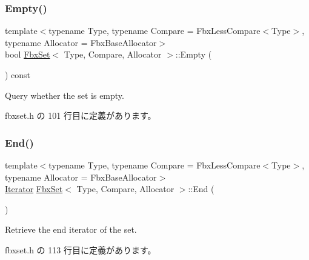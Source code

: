 \subsubsection{\texorpdfstring{Empty()}{Empty()}}
{\footnotesize\ttfamily template$<$typename Type, typename Compare = Fbx\+Less\+Compare$<$\+Type$>$, typename Allocator = Fbx\+Base\+Allocator$>$ \\
bool \hyperlink{class_fbx_set}{Fbx\+Set}$<$ Type, Compare, Allocator $>$\+::Empty (\begin{DoxyParamCaption}{ }\end{DoxyParamCaption}) const\hspace{0.3cm}{\ttfamily [inline]}}



Query whether the set is empty. 



 fbxset.\+h の 101 行目に定義があります。

\mbox{\label{class_fbx_set_aff72352a00b11a896a960f4b562971de}} 
\subsubsection{\texorpdfstring{End()}{End()}\hspace{0.1cm}{\footnotesize\ttfamily [1/2]}}
{\footnotesize\ttfamily template$<$typename Type, typename Compare = Fbx\+Less\+Compare$<$\+Type$>$, typename Allocator = Fbx\+Base\+Allocator$>$ \\
\hyperlink{class_fbx_set_ad1b543e0f63f04f4d2dc8e9e3da9bcaa}{Iterator} \hyperlink{class_fbx_set}{Fbx\+Set}$<$ Type, Compare, Allocator $>$\+::End (\begin{DoxyParamCaption}{ }\end{DoxyParamCaption})\hspace{0.3cm}{\ttfamily [inline]}}



Retrieve the end iterator of the set. 



 fbxset.\+h の 113 行目に定義があります。

\mbox{\label{class_fbx_set_a2d12954434e697202a703cb574072e9d}} 
